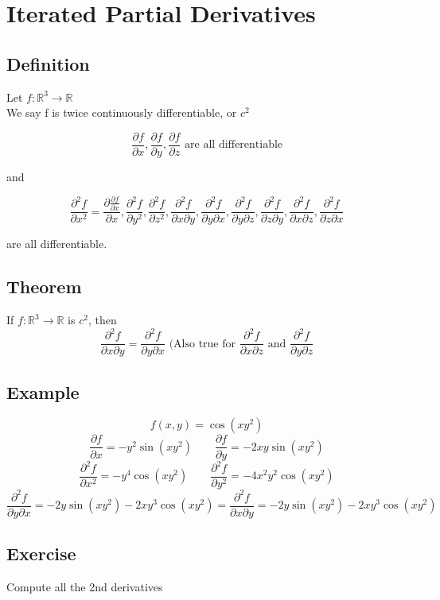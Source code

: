 \documentclass{article}
\begin{document}
\section{Iterated Partial Derivatives}
\subsection*{Definition}
Let $f:\mathbb{R}^3\rightarrow\mathbb{R}$\\
We say f is twice continuously differentiable, or $c^2$

\[\frac{\partial f}{\partial x},\frac{\partial f}{\partial y},\frac{\partial f}{\partial z} \mbox{ are all differentiable}\]
\begin{center}
    and
\end{center}
\[\frac{\partial^2 f}{\partial x^2}=\frac{\partial \frac{\partial f}{\partial x}}{\partial x},\frac{\partial^2 f}{\partial y^2},\frac{\partial^2 f}{\partial z^2},\frac{\partial^2 f}{\partial x \partial y},\frac{\partial^2 f}{\partial y \partial x},\frac{\partial^2 f}{\partial y \partial z},\frac{\partial^2 f}{\partial z \partial y},\frac{\partial^2 f}{\partial x \partial z}, \frac{\partial^2 f}{\partial z \partial x}\]
\begin{center}
    are all differentiable.
\end{center}

\subsection*{Theorem}
If $f:\mathbb{R}^3\rightarrow\mathbb{R}$ is $c^2$, then 
\[\frac{\partial^2 f}{\partial x \partial y} = \frac{\partial^2 f}{\partial y \partial x}\mbox{ (Also true for } \frac{\partial^2 f}{\partial x\partial z}\mbox{ and }\frac{\partial^2 f}{\partial y \partial z}\]

\subsection*{Example}
\[f(x,y) = \cos (xy^2)\]
\[\frac{\partial f}{\partial x} = -y^2\sin(xy^2)\qquad \frac{\partial f}{\partial y}=-2xy\sin(xy^2)\]
\[\frac{\partial^2 f}{\partial x^2}=-y^4\cos(xy^2)\qquad \frac{\partial^2 f}{\partial y^2}=-4x^2y^2\cos(xy^2)\]
\[\frac{\partial^2 f}{\partial y \partial x} = -2y\sin(xy^2) - 2xy^3\cos(xy^2) = \frac{\partial^2 f}{\partial x \partial y}= -2y\sin(xy^2)-2xy^3\cos(xy^2)\]

\subsection*{Exercise}
Compute all the 2nd derivatives
\end{document}
